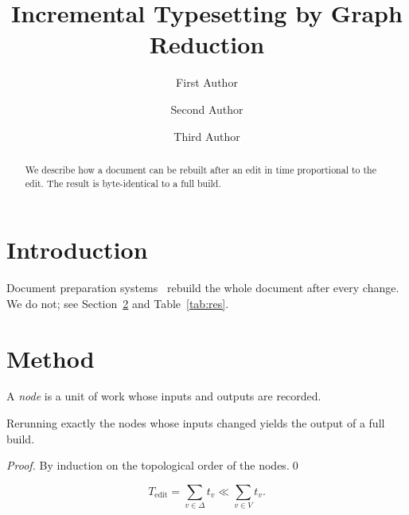 \documentclass[runningheads]{llncs}
\begin{document}
\title{Incremental Typesetting by Graph Reduction}
\author{First Author \and
Second Author \and Third Author}
\maketitle
\begin{abstract}
We describe how a document can be rebuilt after an edit in time
proportional to the edit. The result is byte-identical to a full build.
\end{abstract}
\section{Introduction}
Document preparation systems~\cite{knuth1984,lamport1994} rebuild the
whole document after every change. We do not; see
Section~\ref{sec:method} and Table~\ref{tab:res}.
\section{Method}\label{sec:method}
\begin{definition}
A \emph{node} is a unit of work whose inputs and outputs are recorded.
\end{definition}
\begin{theorem}
Rerunning exactly the nodes whose inputs changed yields the output of a
full build.
\end{theorem}
\begin{proof}
By induction on the topological order of the nodes.\qed
\end{proof}
\begin{equation}
  T_{\text{edit}} = \sum_{v \in \Delta} t_v \ll \sum_{v \in V} t_v .
\end{equation}
\end{document}
